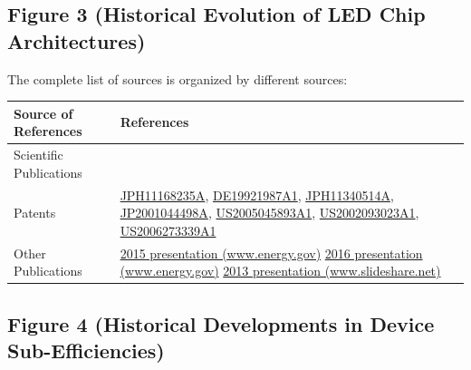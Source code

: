 \documentclass[10pt]{article}
\begin{document}
\subsection{Figure 3 (Historical Evolution of LED Chip Architectures)}

The complete list of sources is organized by different sources:

\begin{table}[h!]
    \begin{tabularx}{\textwidth}{|l|X|}
    \hline
    \textbf{Source of References} & \textbf{References} \\
    \hline
    Scientific Publications & \cite{plossl2010wafer}\cite{bierhuizen2007performance}\cite{gencc2019distributed}\cite{chong2014performance} \\
    \hline
    Patents & \href{https://worldwide.espacenet.com/patent/search?q=pn\%3DJPH11168235A}{JPH11168235A}, 
\href{https://worldwide.espacenet.com/patent/search?q=pn\%3DDE19921987A1}{DE19921987A1}, 
\href{https://worldwide.espacenet.com/patent/search?q=pn\%3DJPH11340514A}{JPH11340514A}, 
\href{https://worldwide.espacenet.com/patent/search?q=pn\%3DJP2001044498A}{JP2001044498A}, 
\href{https://worldwide.espacenet.com/patent/search?q=pn\%3DUS2005045893A1}{US2005045893A1}, 
\href{https://worldwide.espacenet.com/patent/search?q=pn\%3DUS2002093023A1}{US2002093023A1}, 
\href{https://worldwide.espacenet.com/patent/search?q=pn\%3DUS2006273339A1}{US2006273339A1}  \\
    \hline
    Other Publications & \href{https://web.archive.org/web/20170801160530/https://www.energy.gov/sites/prod/files/2015/02/f19/craford_innovation_sanfrancisco2015.pdf}{2015 presentation (www.energy.gov)} \newline
\href{https://web.archive.org/web/20170715230721/https://www.energy.gov/sites/prod/files/2016/02/f29/sun_china_raleigh2016.pdf}{2016 presentation (www.energy.gov)} \newline
\href{http://web.archive.org/web/20160425025936/https://www.slideshare.net/Yole_Developpement/yole-led-packagingjanuary2013reportsample}{2013 presentation (www.slideshare.net)} \\
    \hline
    \end{tabularx}
\end{table}

\subsection{Figure 4 (Historical Developments in Device Sub-Efficiencies)}
\end{document}
